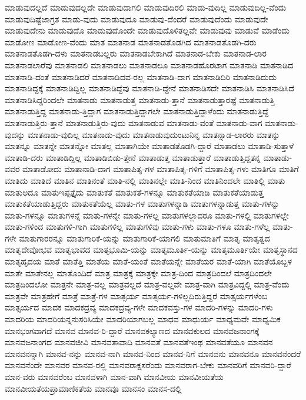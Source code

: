 {ಮಾಡುವುದಲ್ಲದೆ
ಮಾಡುವುದಲ್ಲದೇ
ಮಾಡುವುದಾಗಲಿ
ಮಾಡುವುದಿರಲಿ
ಮಾಡು-ವುದಿಲ್ಲ
ಮಾಡುವುದಿಲ್ಲ-ವೆಂದು
ಮಾಡುವುದಿಷ್ಟೆಜಾಗ್ರತ
ಮಾಡು-ವುದು
ಮಾಡುವುದೂ
ಮಾಡುವು-ದೆಂದರೆ
ಮಾಡುವುದೆಂದು
ಮಾಡುವುದೇ
ಮಾಡುವುದೇನು
ಮಾಡುವುದೊ
ಮಾಡುವುದೊಂದೇ
ಮಾಡುವುದೊಳಿತಲ್ಲವೇ
ಮಾಡುವುವು
ಮಾಡುವೆ
ಮಾಡೆಂದು
ಮಾಡೋಣ
ಮಾಡೋಣ-ವೆಂದು
ಮಾತ
ಮಾತನಾಡ
ಮಾತನಾಡತೊಡಗಿದ
ಮಾತನಾಡತೊಡಗಿ-ದರು
ಮಾತನಾಡತೊಡಗಿ-ದಳು
ಮಾತನಾಡಬಲ್ಲರು
ಮಾತನಾಡಬೇಕಾಗಿದೆ
ಮಾತನಾಡ-ಬೇಕು
ಮಾತನಾಡ-ಲಾರ
ಮಾತನಾಡಲಾರೆವು
ಮಾತನಾಡಲಿ
ಮಾತನಾಡಲು
ಮಾತನಾಡಲೂ
ಮಾತನಾಡಹೊರಟಾಗ
ಮಾತನಾಡಿ
ಮಾತನಾಡಿದ
ಮಾತನಾಡಿ-ದಂತೆ
ಮಾತನಾಡಿದರೆ
ಮಾತನಾಡಿದವ-ರಲ್ಲ
ಮಾತನಾಡಿ-ದಾಗ
ಮಾತನಾಡಿದಿರಿ
ಮಾತನಾಡಿದುದು
ಮಾತನಾಡಿದ್ದಕ್ಕೆ
ಮಾತನಾಡಿದ್ದಿಲ್ಲ
ಮಾತನಾಡಿದ್ದೆವು
ಮಾತನಾಡಿ-ದ್ದೇನೆ
ಮಾತನಾಡಿಸದೇ
ಮಾತನಾಡಿಸಿ
ಮಾತನಾಡಿಸಿದೆ
ಮಾತನಾಡಿಸಿದ್ದರಿಂದಲೇ
ಮಾತನಾಡು
ಮಾತನಾಡುತ್ತ
ಮಾತನಾಡು-ತ್ತಾನೆ
ಮಾತನಾಡುತ್ತಾರಷ್ಟೆ
ಮಾತನಾಡುತ್ತಿ
ಮಾತನಾಡುತ್ತಿದ್ದ
ಮಾತನಾಡು-ತ್ತಿದ್ದಾಗ
ಮಾತನಾಡುತ್ತಿದ್ದಾಗಲೇ
ಮಾತನಾಡುತ್ತಿದ್ದಾಳೆಂದು
ಮಾತನಾಡುತ್ತಿದ್ದೆ
ಮಾತನಾಡುತ್ತಿರು-ತ್ತಾನೆ
ಮಾತನಾಡುತ್ತಿರು-ವುದು
ಮಾತನಾಡುವ
ಮಾತನಾಡು-ವಂತೆ
ಮಾತನಾಡು-ವಾಗ
ಮಾತನಾಡು-ವುದನ್ನು
ಮಾತನಾಡು-ವುದಿಲ್ಲ
ಮಾತನಾಡು-ವುದು
ಮಾತನಾಡುವುದುಂಟುನಿನ್ನ
ಮಾತನ್ನಾಡ-ಲಾರರು
ಮಾತನ್ನು
ಮಾತನ್ನೂ
ಮಾತನ್ನೇ
ಮಾತನ್ನೋ
ಮಾತಲ್ಲ
ಮಾತಾಗಿಯೇ
ಮಾತಾಡತೊಡಗಿ-ದ್ದಾರೆ
ಮಾತಾಡಲು
ಮಾತಾಡಿ-ಸುತ್ತಾಳೆ
ಮಾತಾಡಿ-ದರು
ಮಾತಾಡಿದ್ದಿಲ್ಲ
ಮಾತಾಡಿಬಿಡು-ತ್ತೇನೆ
ಮಾತಾಡುತ್ತ
ಮಾತಾಡುತ್ತಾರೆ
ಮಾತಾಡುತ್ತಿದ್ದತನ್ನ
ಮಾತಾಡು-ವವರ
ಮಾತಾಡೋದು
ಮಾತಾನಾಡಿ-ದಾಗ
ಮಾತಾಪಿತೃ-ಗಳ
ಮಾತಾಪಿತೃ-ಗಳಿಗೆ
ಮಾತಾಪಿತೃ-ಗಳು
ಮಾತಿಗೂ
ಮಾತಿಗೆ
ಮಾತಿದು
ಮಾತಿದೆ
ಮಾತಿನ
ಮಾತಿನಂತೆ
ಮಾತಿ-ನಲ್ಲಿ
ಮಾತಿನಲ್ಲೇ
ಮಾತಿ-ನಿಂದ
ಮಾತಿನಿಂದಲೇ
ಮಾತಿಲ್ಲಿ
ಮಾತು
ಮಾತುಅದೂ
ಮಾತುಇಪ್ಪತ್ತೈದು
ಮಾತುಕತೆ
ಮಾತುಕತೆ-ಗಳನ್ನೂ
ಮಾತುಕತೆಯಾಡಿ
ಮಾತುಕತೆಯಾಡುತ್ತ
ಮಾತುಕತೆಯಾಡುತ್ತಿದ್ದರು
ಮಾತುಕತೆಯೆಲ್ಲ
ಮಾತು-ಗಳ
ಮಾತುಗಳನ್ನಾಡಿ
ಮಾತುಗಳನ್ನಾಡುತ್ತ
ಮಾತು-ಗಳನ್ನು
ಮಾತು-ಗಳನ್ನೂ
ಮಾತುಗಳನ್ನೆ
ಮಾತು-ಗಳನ್ನೇ
ಮಾತು-ಗಳಲ್ಲ
ಮಾತುಗಳಲ್ಲಾದರೂ
ಮಾತು-ಗಳಲ್ಲಿ
ಮಾತುಗಳಲ್ಲೇ
ಮಾತು-ಗಳಿಂದ
ಮಾತುಗಳಿ-ಗಾಗಿ
ಮಾತುಗಳಿಲ್ಲ
ಮಾತುಗಳಿವು
ಮಾತು-ಗಳು
ಮಾತು-ಗಳೂ
ಮಾತು-ಗಳೆಲ್ಲ
ಮಾತು-ಗಳೇ
ಮಾತುಗಾರರನ್ನೂ
ಮಾತುಗಾರಿಕೆ-ಯನ್ನು
ಮಾತುಗಾರಿಕೆ-ಯಾಗಲಿ
ಮಾತುಮಾತಿಗೆ
ಮಾತೃ
ಮಾತೃತ್ವದ
ಮಾತೃದೇವೋಭವ
ಮಾತೃಭಾವದ
ಮಾತೃಭೂಮಿ-ಯನ್ನು
ಮಾತೃಮೂರ್ತಿ-ಯನ್ನು
ಮಾತೃಮೂರ್ತಿಯೇ
ಮಾತೃಸ್ಥಾನದ
ಮಾತೃಹೃದಯ
ಮಾತೆ
ಮಾತೆತ್ತಿ
ಮಾತೆಯ
ಮಾತೆ-ಯಂತೆ
ಮಾತೆಯನ್ನೇ
ಮಾತೆಯರ
ಮಾತೆ-ಯಾಗಿ
ಮಾತೆಯೊಬ್ಬಳ
ಮಾತೇ
ಮಾತೇನಲ್ಲ
ಮಾತೊಂದಿದೆ
ಮಾತ್ರ
ಮಾತ್ರಕ್ಕೆ
ಮಾತ್ರಕ್ಕೇ
ಮಾತ್ರ-ದಿಂದ
ಮಾತ್ರದಿಂದಲೆ
ಮಾತ್ರದಿಂದಲೇ
ಮಾತ್ರದಿಂದಲೋ
ಮಾತ್ರನೇ
ಮಾತ್ರ-ವಲ್ಲ
ಮಾತ್ರವಲ್ಲದೆ
ಮಾತ್ರ-ವಲ್ಲವೇ
ಮಾತ್ರ-ವಾಗಿ
ಮಾತ್ರವಿದ್ದಲ್ಲಿ
ಮಾತ್ರ-ವೆಂದು
ಮಾತ್ರವೇ
ಮಾತ್ರಹೇಗೆ
ಮಾತ್ರೆ
ಮಾತ್ರೆ-ಗಳ
ಮಾತ್ಸರ್ಯ
ಮಾತ್ಸರ್ಯ-ಗಳಿಲ್ಲದಿರುತ್ತಿದ್ದರೆ
ಮಾತ್ಸರ್ಯಗಳೆಂಬ
ಮಾತ್ಸರ್ಯದ
ಮಾದಕ
ಮಾದಕದ್ರವ್ಯ
ಮಾದಕದ್ರವ್ಯ-ಗಳೇ
ಮಾದಕವಸ್ತು-ಗಳ
ಮಾದರಿ-ಗಳನ್ನು
ಮಾದರಿ-ಗಳು
ಮಾದರಿಯ
ಮಾದರಿಯನ್ನನುಸರಿಸಿಯೇ
ಮಾದರಿಯಾಗಬಲ್ಲ
ಮಾಧವ
ಮಾಧುರ್ಯ
ಮಾಧ್ಯಮವೇ
ಮಾಧ್ಯಮಿಕ
ಮಾನಭಂಗವಾಗದೆ
ಮಾನವ
ಮಾನವ-ರಿ-ದ್ದಾರೆ
ಮಾನವಕಲ್ಯಾಣದ
ಮಾನವಕುಲದ
ಮಾನವಜನಾಂಗಕ್ಕೆ
ಮಾನವಜನಾಂಗದ
ಮಾನವಜೀವಿ
ಮಾನವತಾವಾದಿ
ಮಾನವತೆ
ಮಾನವತೆಇಂಥ
ಮಾನವತೆಯೂ
ಮಾನವನ
ಮಾನವನನ್ನಾಗಿ
ಮಾನವ-ನನ್ನು
ಮಾನವ-ನಾಗಿ
ಮಾನವ-ನಿಂದ
ಮಾನವ-ನಿಗೆ
ಮಾನವನು
ಮಾನವನೂ
ಮಾನವನೆಂದರೆ
ಮಾನವನೆಂದೇ
ಮಾನವರ
ಮಾನವ-ರಲ್ಲಿ
ಮಾನವರಾಕ್ಷಸರೆಂದು
ಮಾನವರಾಗ-ಬೇಕು
ಮಾನವರಿಗೆ
ಮಾನವರಿ-ದ್ದಾರೆ
ಮಾನ-ವರು
ಮಾನವರೆಂಬ
ಮಾನವಳಾಗಿ
ಮಾನ-ವಾಗಿ
ಮಾನವೀಯ
ಮಾನವೀಯತೆಯ
ಮಾನವೀಯತೆಯಪ್ರಾಮಾಣಿಕತೆಯ
ಮಾನವೂ
ಮಾನಸಂ
ಮಾನಸ-ದಲ್ಲಿ
}
